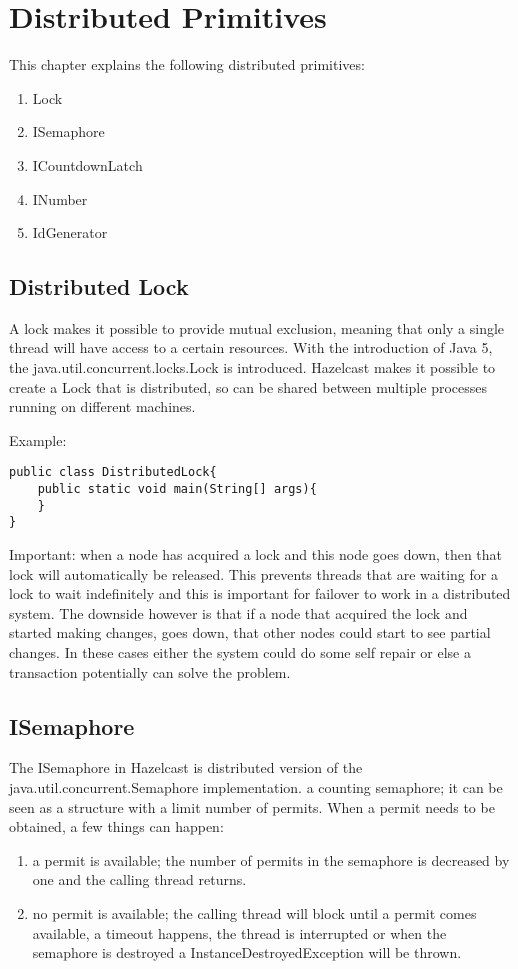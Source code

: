 \chapter{Distributed Primitives}

This chapter explains the following distributed primitives:
\begin{enumerate}
\item Lock
\item ISemaphore
\item ICountdownLatch
\item INumber
\item IdGenerator
\end{enumerate}

\section{Distributed Lock}

A lock makes it possible to provide mutual exclusion, meaning that only a single
thread will have access to a certain resources. With the introduction of Java 5,
the java.util.concurrent.locks.Lock is introduced. Hazelcast makes it possible
to create a Lock that is distributed, so can be shared between multiple processes
running on different machines.

Example:

\begin{verbatim}
public class DistributedLock{
    public static void main(String[] args){
    }
}
\end{verbatim}

Important: when a node has acquired a lock and this node goes down, then that lock will
automatically be released. This prevents threads that are waiting for a lock to wait 
indefinitely and this is important for failover to work in a distributed system. The downside
however is that if a node that acquired the lock and started making changes, goes down,
that other nodes could start to see partial changes. In these cases either the system
could do some self repair or else a transaction potentially can solve the problem.

\section{ISemaphore}

The ISemaphore in Hazelcast is distributed version of the java.util.concurrent.Semaphore
implementation. a counting semaphore; it can be seen as a structure with 
a limit number of permits. When a permit needs to be obtained, a few things can happen:
\begin{enumerate}
\item a permit is available; the number of permits in the semaphore is decreased by one 
and the calling thread returns.
\item no permit is available; the calling thread will block until a permit comes available,
a timeout happens, the thread is interrupted or when the semaphore is destroyed a InstanceDestroyedException
will be thrown.
\end{enumerate}

